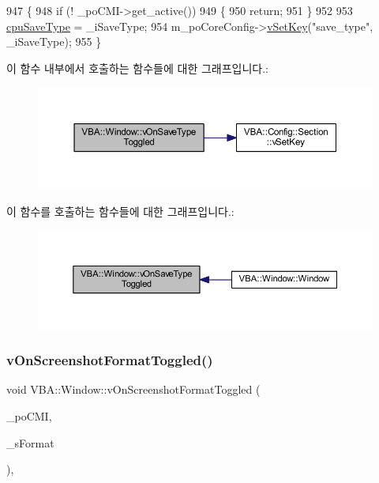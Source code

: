 \begin{DoxyCode}
947 \{
948   \textcolor{keywordflow}{if} (! \_poCMI->get\_active())
949   \{
950     \textcolor{keywordflow}{return};
951   \}
952 
953   \mbox{\hyperlink{_globals_8cpp_a8a45d318e0d21c0ab6ab1a54b5be74ea}{cpuSaveType}} = \_iSaveType;
954   m\_poCoreConfig->\mbox{\hyperlink{class_v_b_a_1_1_config_1_1_section_a57e1b95cbea40db71c093381beff4b0e}{vSetKey}}(\textcolor{stringliteral}{"save\_type"}, \_iSaveType);
955 \}
\end{DoxyCode}
이 함수 내부에서 호출하는 함수들에 대한 그래프입니다.\+:
\nopagebreak
\begin{figure}[H]
\begin{center}
\leavevmode
\includegraphics[width=350pt]{class_v_b_a_1_1_window_ac28bedaab2e51b684869e85b4b20b7be_cgraph}
\end{center}
\end{figure}
이 함수를 호출하는 함수들에 대한 그래프입니다.\+:
\nopagebreak
\begin{figure}[H]
\begin{center}
\leavevmode
\includegraphics[width=350pt]{class_v_b_a_1_1_window_ac28bedaab2e51b684869e85b4b20b7be_icgraph}
\end{center}
\end{figure}
\mbox{\label{class_v_b_a_1_1_window_a8536700b1c3ab6cd07b8fd14bf3d3d82}} 
\subsubsection{\texorpdfstring{v\+On\+Screenshot\+Format\+Toggled()}{vOnScreenshotFormatToggled()}}
{\footnotesize\ttfamily void V\+B\+A\+::\+Window\+::v\+On\+Screenshot\+Format\+Toggled (\begin{DoxyParamCaption}\item[{Gtk\+::\+Check\+Menu\+Item $\ast$}]{\+\_\+po\+C\+MI,  }\item[{std\+::string}]{\+\_\+s\+Format }\end{DoxyParamCaption})\hspace{0.3cm}{\ttfamily [protected]}, {\ttfamily [virtual]}}



